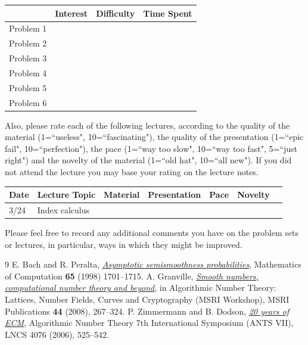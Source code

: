 \documentclass[11pt]{article}
\theoremstyle{definition}
\begin{document}
\begin{center}
\begin{tabular}{l|r|r|r|}
& Interest & Difficulty & Time Spent\\\hline
Problem 1 & & & \\\hline
Problem 2 & & & \\\hline
Problem 3 & & & \\\hline
Problem 4 & & & \\\hline
Problem 5 & & & \\\hline
Problem 6 & & & \\\hline
\end{tabular}
\end{center}
\noindent
Also, please rate each of the following lectures, according to the quality of the material (1=``useless", 10=``fascinating"), the quality of the presentation (1=``epic fail", 10=``perfection"), the pace (1=``way too slow", 10=``way too fast", 5=``just right") and the novelty of the material (1=``old hat", 10=``all new").  If you did not attend the lecture you may base your rating on the lecture notes.

\begin{center}
\begin{tabular}{l|l|r|r|r|r|r}
Date & Lecture Topic & Material & Presentation & Pace & Novelty\\\hline
3/24 & Index calculus & & & & \\\hline 
\end{tabular}
\end{center}

\noindent
Please feel free to record any additional comments you have on the problem sets or lectures, in particular, ways in which they might be improved.



\begin{thebibliography}{9}
	E. Bach and R. Peralta, \href{http://www.jstor.org/stable/2153733}{\textit{Asymptotic semismoothness probabilities}}, Mathematics of Computation \textbf{65} (1998)  1701--1715.
	A. Granville, \href{http://library.msri.org/books/Book44/files/09andrew.pdf}{\textit{Smooth numbers, computational number theory and beyond}}, in Algorithmic Number Theory: Lattices, Number Fields, Curves and Cryptography (MSRI Workshop), MSRI Publications \textbf{44} (2008), 267--324.
	P. Zimmermann and B. Dodson, \href{http://link.springer.com/chapter/10.1007/11792086_37}{\textit{20 years of ECM}}, Algorithmic Number Theory 7th International Symposium (ANTS VII),
LNCS 4076 (2006), 525--542.
\end{thebibliography}
\end{document}
